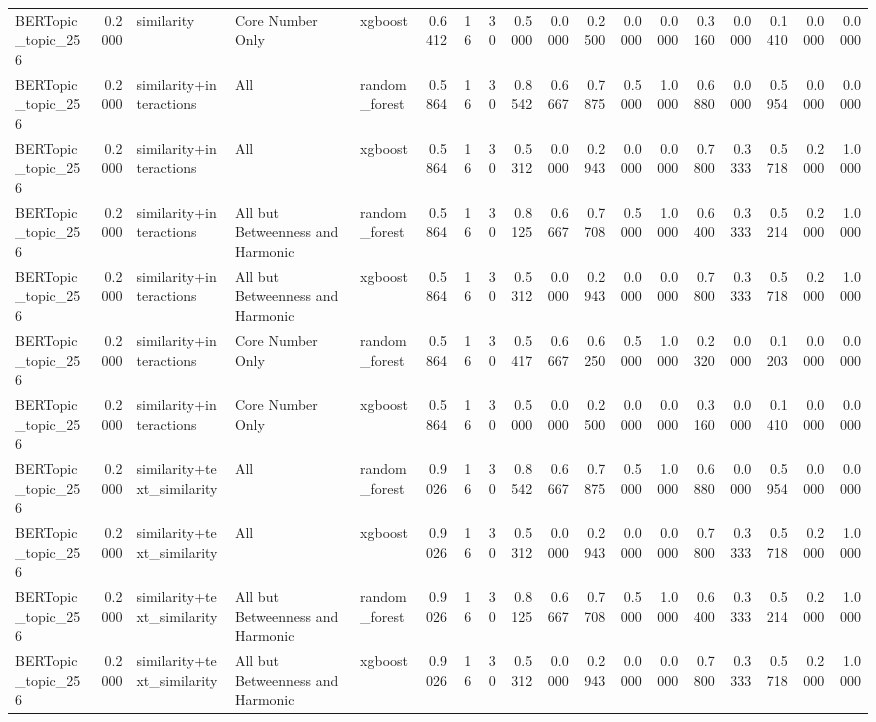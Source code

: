 \begin{tabular}{lrlllrrrrrrrrrrrrr}
BERTopic_topic_256 & 0.2000 & similarity & Core Number Only & xgboost & 0.6412 & 16 & 30 & 0.5000 & 0.0000 & 0.2500 & 0.0000 & 0.0000 & 0.3160 & 0.0000 & 0.1410 & 0.0000 & 0.0000 \\
BERTopic_topic_256 & 0.2000 & similarity+interactions & All & random_forest & 0.5864 & 16 & 30 & 0.8542 & 0.6667 & 0.7875 & 0.5000 & 1.0000 & 0.6880 & 0.0000 & 0.5954 & 0.0000 & 0.0000 \\
BERTopic_topic_256 & 0.2000 & similarity+interactions & All & xgboost & 0.5864 & 16 & 30 & 0.5312 & 0.0000 & 0.2943 & 0.0000 & 0.0000 & 0.7800 & 0.3333 & 0.5718 & 0.2000 & 1.0000 \\
BERTopic_topic_256 & 0.2000 & similarity+interactions & All but Betweenness and Harmonic & random_forest & 0.5864 & 16 & 30 & 0.8125 & 0.6667 & 0.7708 & 0.5000 & 1.0000 & 0.6400 & 0.3333 & 0.5214 & 0.2000 & 1.0000 \\
BERTopic_topic_256 & 0.2000 & similarity+interactions & All but Betweenness and Harmonic & xgboost & 0.5864 & 16 & 30 & 0.5312 & 0.0000 & 0.2943 & 0.0000 & 0.0000 & 0.7800 & 0.3333 & 0.5718 & 0.2000 & 1.0000 \\
BERTopic_topic_256 & 0.2000 & similarity+interactions & Core Number Only & random_forest & 0.5864 & 16 & 30 & 0.5417 & 0.6667 & 0.6250 & 0.5000 & 1.0000 & 0.2320 & 0.0000 & 0.1203 & 0.0000 & 0.0000 \\
BERTopic_topic_256 & 0.2000 & similarity+interactions & Core Number Only & xgboost & 0.5864 & 16 & 30 & 0.5000 & 0.0000 & 0.2500 & 0.0000 & 0.0000 & 0.3160 & 0.0000 & 0.1410 & 0.0000 & 0.0000 \\
BERTopic_topic_256 & 0.2000 & similarity+text_similarity & All & random_forest & 0.9026 & 16 & 30 & 0.8542 & 0.6667 & 0.7875 & 0.5000 & 1.0000 & 0.6880 & 0.0000 & 0.5954 & 0.0000 & 0.0000 \\
BERTopic_topic_256 & 0.2000 & similarity+text_similarity & All & xgboost & 0.9026 & 16 & 30 & 0.5312 & 0.0000 & 0.2943 & 0.0000 & 0.0000 & 0.7800 & 0.3333 & 0.5718 & 0.2000 & 1.0000 \\
BERTopic_topic_256 & 0.2000 & similarity+text_similarity & All but Betweenness and Harmonic & random_forest & 0.9026 & 16 & 30 & 0.8125 & 0.6667 & 0.7708 & 0.5000 & 1.0000 & 0.6400 & 0.3333 & 0.5214 & 0.2000 & 1.0000 \\
BERTopic_topic_256 & 0.2000 & similarity+text_similarity & All but Betweenness and Harmonic & xgboost & 0.9026 & 16 & 30 & 0.5312 & 0.0000 & 0.2943 & 0.0000 & 0.0000 & 0.7800 & 0.3333 & 0.5718 & 0.2000 & 1.0000 \\

\end{tabular}
